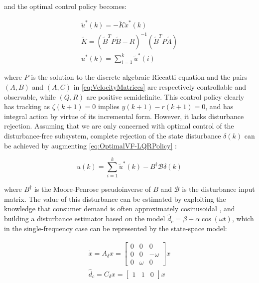 and the optimal control policy becomes:

\begin{equation}\label{eq:OptimalVF-LQRPolicy}
\begin{gathered}
\tilde{u}^*(k)  = -\tilde{K}\tilde{x}^*(k) \\
\tilde{K} = (\tilde{B}^TP\tilde{B}-R)^{-1}(\tilde{B}^TP\tilde{A}) \\
u^*(k) = \sum_{i=1}^{k} \tilde{u}^*(i)
\end{gathered}
\end{equation}

where $P$ is the solution to the discrete algebraic Riccatti equation and the pairs $(A,B)$ and $(A,C)$ in \cref{eq:VelocityMatrices} are respectively controllable and observable, while $(Q,R)$ are positive semidefinite. This control policy clearly has tracking as $\zeta(k+1) = 0$ implies $y(k+1)-r(k+1) = 0$, and has integral action by virtue of its incremental form. However, it lacks disturbance rejection. Assuming that we are only concerned with optimal control of the disturbance-free subsystem, complete rejection of the state disturbance $\delta(k)$ can be achieved by augmenting \cref{eq:OptimalVF-LQRPolicy} \cite{Singh2017}:

\begin{equation}
	u(k) = \sum_{i=1}^{k} \tilde{u}^*(k) - B^\dagger \mathcal{B}\delta(k)
\end{equation}

where $B^\dagger$ is the Moore-Penrose pseudoinverse of $B$ and $\mathcal{B}$ is the disturbance input matrix. The value of this disturbance can be estimated by exploiting the knowledge that consumer demand is often approximately cosinusoidal \cite{Anele2017}, and building a disturbance estimator based on the model $\hat{d}_c = \beta + \alpha\cos(\omega t)$, which in the single-frequency case can be represented by the state-space model:

\begin{equation}\label{eq:TheisticDisturbanceEstimator}
	\begin{gathered}
		\dot{x} = A_\delta x =  \begin{bmatrix}0 & 0 & 0 \\ 0 & 0 & -\omega \\ 0 & \omega & 0	\end{bmatrix}x \\
		\hat{d}_c = C_\delta x = \begin{bmatrix} 1 & 1 & 0 \end{bmatrix} x
	\end{gathered}
\end{equation}

